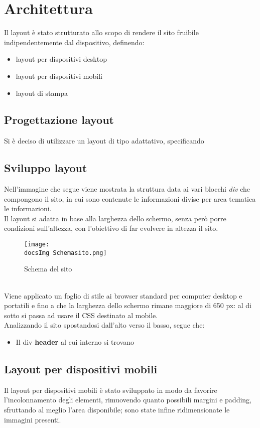 \section{Architettura}{
	Il layout è stato strutturato allo scopo di rendere il sito fruibile indipendentemente dal dispositivo, definendo:
	\begin{itemize}\itemsep1pt
		\item layout per dispositivi desktop
		\item layout per dispositivi mobili
		\item layout di stampa
	\end{itemize} 
	
	\subsection{Progettazione layout}{
		Si è deciso di utilizzare un layout di tipo adattativo, specificando 
	}
	\subsection{Sviluppo layout}{
		Nell'immagine che segue viene mostrata la struttura data ai vari blocchi \textit{div} che compongono il sito, in cui sono contenute le informazioni divise per area tematica le informazioni.
	\\
	Il layout si adatta in base alla larghezza dello schermo, senza però porre condizioni sull'altezza, con l'obiettivo di far evolvere in altezza il sito.
		\begin{figure}[H]
			\texttt{[image: \\docsImg Schemasito.png]}
			\caption{Schema del sito}
			\label{Schema del sito}
		\end{figure}
		\\
		Viene applicato un foglio di stile ai browser standard per computer desktop e portatili e fino a che la larghezza dello schermo rimane maggiore di 650 px: al di sotto si passa ad usare il CSS destinato al mobile.
		\\
		Analizzando il sito spostandosi dall'alto verso il basso, segue che:
		\begin{itemize}
			\item Il div \textbf{header} al cui interno si trovano 
		\end{itemize}
		}
	\subsection{Layout per dispositivi mobili}{
		Il layout per dispositivi mobili è stato sviluppato in modo da favorire l'incolonnamento degli elementi, rimuovendo quanto possibili margini e padding, sfruttando al meglio l'area disponibile; sono state infine ridimensionate le immagini presenti.
	}
}
